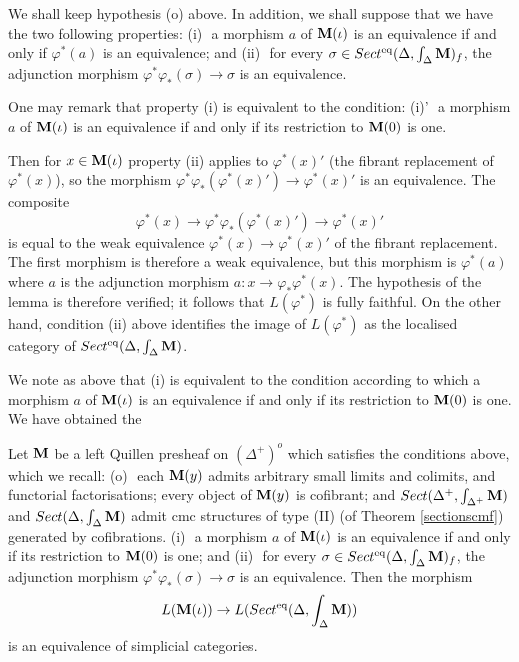 We shall keep hypothesis (o) above.
In addition, we shall suppose that we have the two following
properties: \newline
(i)\,\, a morphism $a$ of ${\bf M} (\iota )$ is an equivalence
if and only if $\varphi ^{\ast} (a)$ is an equivalence; and
\newline
(ii)\,\, for every $\sigma \in Sect ^{\rm eq} (\Delta , \int _{\Delta} {\bf M} )_f$,
the adjunction morphism $\varphi ^{\ast} \varphi _{\ast} (\sigma )
\rightarrow \sigma$
is an equivalence.

One may remark that property (i) is equivalent
to the condition:
\newline
(i)'\,\, a morphism $a$ of ${\bf M} (\iota )$ is
an equivalence if and only if
its restriction to ${\bf M} (0)$ is one.

Then for $x\in {\bf M} (\iota )$ property (ii) applies to
$\varphi ^{\ast} (x)'$
(the fibrant replacement of $\varphi ^{\ast} (x)$),
so the morphism
$\varphi ^{\ast} \varphi _{\ast} (\varphi ^{\ast} (x)')\rightarrow \varphi
^{\ast} (x)'$ is an equivalence. The
composite
$$
\varphi ^{\ast} (x)\rightarrow \varphi ^{\ast}
 \varphi _{\ast} (\varphi ^{\ast} (x)') \rightarrow \varphi ^{\ast} (x)'
$$
is equal to the weak equivalence $\varphi ^{\ast} (x)\rightarrow
\varphi ^{\ast} (x)'$ of the
fibrant replacement. The first morphism is therefore a weak equivalence,
but this morphism is $\varphi ^{\ast} (a)$ where $a$ is the adjunction
morphism
$a:x\rightarrow \varphi _{\ast} \varphi ^{\ast} (x)$. The hypothesis of the
lemma is therefore verified; it follows that
$L(\varphi ^{\ast} )$ is fully faithful. On the other hand,
condition (ii)
above
identifies the image of $L(\varphi ^{\ast} )$ as the localised category of
$Sect
^{\rm eq} (\Delta
, \int _{\Delta} {\bf M} )$.

We note as above that (i) is equivalent to the condition
according to which
a morphism $a$ of ${\bf M} (\iota )$ is an equivalence
if and only if its restriction to ${\bf M} (0)$ is one.
We have obtained the

\begin{corollary}
\label{dpq2}
Let ${\bf M}$ be a left Quillen presheaf on $(\Delta ^+)^o$
which satisfies the conditions above, which we recall:
\newline
(o)\,\, each ${\bf M} (y)$ admits arbitrary small limits and colimits,
and functorial factorisations;
every object of ${\bf M} (y)$ is cofibrant; and $Sect (\Delta ^+, \int
_{\Delta ^+}{\bf M} )$ and $Sect (\Delta , \int _{\Delta} {\bf M} )$ admit
cmc structures of type (II) (of
Theorem \ref{sectionscmf}) generated by
cofibrations.
\newline
(i)\,\, a morphism $a$ of ${\bf M} (\iota )$ is an equivalence
if and only if its restriction to ${\bf M} (0)$ is one; and
\newline
(ii)\,\, for every $\sigma \in Sect ^{\rm eq} (\Delta , \int _{\Delta} {\bf M} )_f$,
the adjunction morphism $\varphi ^{\ast} \varphi _{\ast} (\sigma )
\rightarrow \sigma$
is an equivalence.
\newline
Then the morphism
$$
L({\bf M} (\iota ))\rightarrow
L(Sect ^{\rm eq} (\Delta , \int _{\Delta} {\bf M} ))
$$
is an equivalence of simplicial categories.
\end{corollary}
\eop

